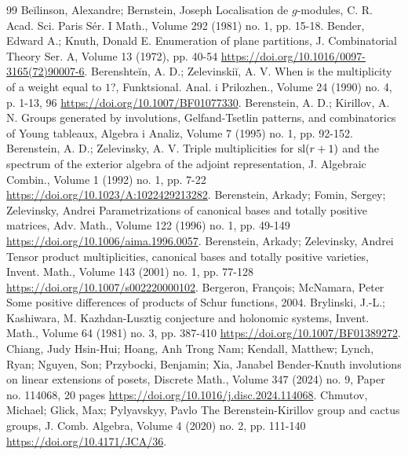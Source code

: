 \documentclass[10pt,a4paper]{article}
\theoremstyle{definition}
\numberwithin{equation}{section}
\begin{document}
\begin{thebibliography}{99}
 Beĭlinson, Alexandre; Bernstein, Joseph Localisation de $g$-modules, C. R. Acad. Sci. Paris Sér. I Math., Volume 292 (1981) no. 1, pp. 15-18.
 Bender, Edward A.; Knuth, Donald E. Enumeration of plane partitions, J. Combinatorial Theory Ser. A, Volume 13 (1972), pp. 40-54 \url{https://doi.org/10.1016/0097-3165(72)90007-6}.
 Berenshteĭn, A. D.; Zelevinskiĭ, A. V. When is the multiplicity of a weight equal to $1$?, Funktsional. Anal. i Prilozhen., Volume 24 (1990) no. 4, p. 1-13, 96 \url{https://doi.org/10.1007/BF01077330}.
 Berenstein, A. D.; Kirillov, A. N. Groups generated by involutions, Gelfand-Tsetlin patterns, and combinatorics of Young tableaux, Algebra i Analiz, Volume 7 (1995) no. 1, pp. 92-152.
 Berenstein, A. D.; Zelevinsky, A. V. Triple multiplicities for ${\rm sl}(r+1)$ and the spectrum of the exterior algebra of the adjoint representation, J. Algebraic Combin., Volume 1 (1992) no. 1, pp. 7-22 \url{https://doi.org/10.1023/A:1022429213282}.
 Berenstein, Arkady; Fomin, Sergey; Zelevinsky, Andrei Parametrizations of canonical bases and totally positive matrices, Adv. Math., Volume 122 (1996) no. 1, pp. 49-149 \url{https://doi.org/10.1006/aima.1996.0057}.
 Berenstein, Arkady; Zelevinsky, Andrei Tensor product multiplicities, canonical bases and totally positive varieties, Invent. Math., Volume 143 (2001) no. 1, pp. 77-128 \url{https://doi.org/10.1007/s002220000102}.
 Bergeron, François; McNamara, Peter Some positive differences of products of Schur functions, 2004.
 Brylinski, J.-L.; Kashiwara, M. Kazhdan-Lusztig conjecture and holonomic systems, Invent. Math., Volume 64 (1981) no. 3, pp. 387-410 \url{https://doi.org/10.1007/BF01389272}.
 Chiang, Judy Hsin-Hui; Hoang, Anh Trong Nam; Kendall, Matthew; Lynch, Ryan; Nguyen, Son; Przybocki, Benjamin; Xia, Janabel Bender-Knuth involutions on linear extensions of posets, Discrete Math., Volume 347 (2024) no. 9, Paper no. 114068, 20 pages \url{https://doi.org/10.1016/j.disc.2024.114068}.
 Chmutov, Michael; Glick, Max; Pylyavskyy, Pavlo The Berenstein-Kirillov group and cactus groups, J. Comb. Algebra, Volume 4 (2020) no. 2, pp. 111-140 \url{https://doi.org/10.4171/JCA/36}.

\end{thebibliography}
\end{document}
